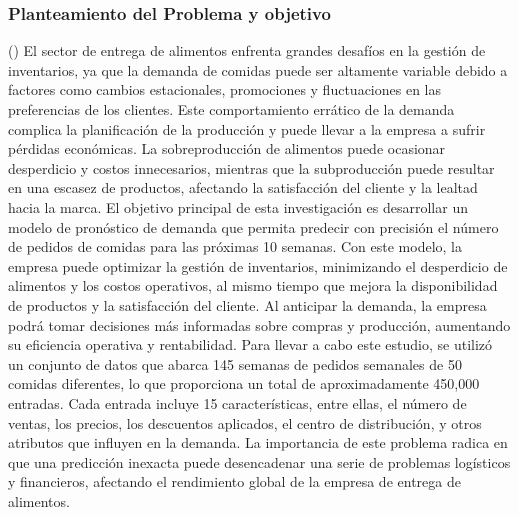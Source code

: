 \subsubsection{Planteamiento del Problema y objetivo }
(\cite{Pandasandeep2023}) El sector de entrega de alimentos enfrenta grandes desafíos en la gestión de inventarios, ya que la demanda de comidas puede ser altamente variable debido a factores como cambios estacionales, promociones y fluctuaciones en las preferencias de los clientes. Este comportamiento errático de la demanda complica la planificación de la producción y puede llevar a la empresa a sufrir pérdidas económicas. La sobreproducción de alimentos puede ocasionar desperdicio y costos innecesarios, mientras que la subproducción puede resultar en una escasez de productos, afectando la satisfacción del cliente y la lealtad hacia la marca.
El objetivo principal de esta investigación es desarrollar un modelo de pronóstico de demanda que permita predecir con precisión el número de pedidos de comidas para las próximas 10 semanas. Con este modelo, la empresa puede optimizar la gestión de inventarios, minimizando el desperdicio de alimentos y los costos operativos, al mismo tiempo que mejora la disponibilidad de productos y la satisfacción del cliente. Al anticipar la demanda, la empresa podrá tomar decisiones más informadas sobre compras y producción, aumentando su eficiencia operativa y rentabilidad.
Para llevar a cabo este estudio, se utilizó un conjunto de datos que abarca 145 semanas de pedidos semanales de 50 comidas diferentes, lo que proporciona un total de aproximadamente 450,000 entradas. Cada entrada incluye 15 características, entre ellas, el número de ventas, los precios, los descuentos aplicados, el centro de distribución, y otros atributos que influyen en la demanda. La importancia de este problema radica en que una predicción inexacta puede desencadenar una serie de problemas logísticos y financieros, afectando el rendimiento global de la empresa de entrega de alimentos.


